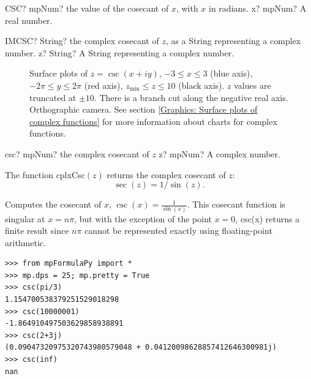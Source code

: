 \begin{mpFunctionsExtract}
	\mpWorksheetFunctionOneNotImplemented
	{CSC? mpNum? the value of the cosecant of $x$, with $x$ in radians.}
	{x? mpNum? A real number.}
\end{mpFunctionsExtract}

\vspace{0.6cm}
\begin{mpFunctionsExtract}
	\mpWorksheetFunctionOneNotImplemented
	{IMCSC? String? the complex cosecant of $z$, as a String representing a complex number.}
	{z? String? A String representing a complex number.}
\end{mpFunctionsExtract}


\begin{figure}[ht]%
	\centering
	\qquad
	\caption[Complex Cosecant]{Surface plots of $z = \csc(x + iy)$, $-3 \leq x \leq 3$ (blue axis), $-2 \pi \leq y \leq 2\pi$ (red axis), $z_{\text{min}} \leq z \leq 10$ (black axis). $z$ values are truncated at $\pm 10$. There is a branch cut along the negative real axis. Orthographic camera. See section \ref{Graphics: Surface plots of complex functions} for more information about charts for complex functions.} 
	\label{fig:Complex Cosecant}%
\end{figure}

\begin{mpFunctionsExtract}
	\mpFunctionOne
	{csc? mpNum? the complex cosecant of $z$}
	{z? mpNum? A complex number.}
\end{mpFunctionsExtract}

\vspace{0.3cm}
The function \textsf{cplxCsc$(z)$} returns the complex cosecant of $z$: 
\begin{equation}
	\sec(z) = 1/\sin(z).
\end{equation}


Computes the cosecant of $x$, $\csc(x)=\frac{1}{\sin(x)}$. This cosecant function is singular at $x=n \pi$, but with the exception of the point $x=0$, csc(x) returns a finite result since $n \pi$ cannot be represented exactly using floating-point arithmetic.

\begin{lstlisting}
>>> from mpFormulaPy import *
>>> mp.dps = 25; mp.pretty = True
>>> csc(pi/3)
1.154700538379251529018298
>>> csc(10000001)
-1.864910497503629858938891
>>> csc(2+3j)
(0.09047320975320743980579048 + 0.04120098628857412646300981j)
>>> csc(inf)
nan
\end{lstlisting}



